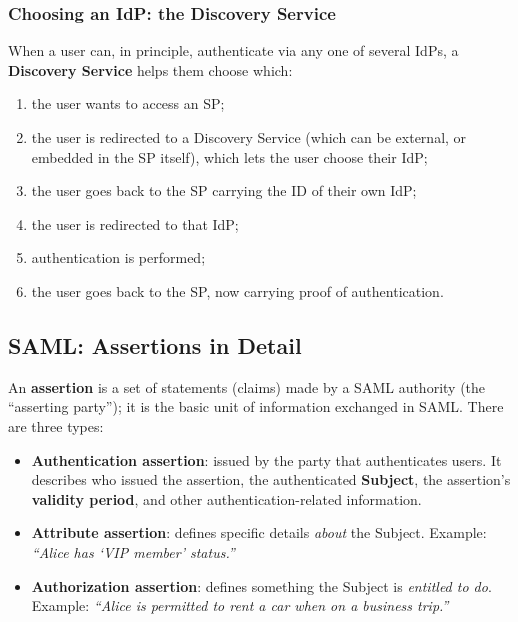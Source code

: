 \documentclass[12pt, a4paper]{article}
\begin{document}
\subsubsection{Choosing an IdP: the Discovery Service}
When a user can, in principle, authenticate via any one of several IdPs, a \textbf{Discovery Service} helps them choose which:
\begin{enumerate}
    \item the user wants to access an SP;
    \item the user is redirected to a Discovery Service (which can be external, or embedded in the SP itself), which lets the user choose their IdP;
    \item the user goes back to the SP carrying the ID of their own IdP;
    \item the user is redirected to that IdP;
    \item authentication is performed;
    \item the user goes back to the SP, now carrying proof of authentication.
\end{enumerate}











\subsection{SAML: Assertions in Detail}
\label{subsec:saml-assertions-06}

An \textbf{assertion} is a set of statements (claims) made by a SAML authority (the ``asserting party''); it is the basic unit of information exchanged in SAML. There are three types:
\begin{itemize}
    \item \textbf{Authentication assertion}: issued by the party that authenticates users. It describes who issued the assertion, the authenticated \textbf{Subject}, the assertion's \textbf{validity period}, and other authentication-related information.
    \item \textbf{Attribute assertion}: defines specific details \emph{about} the Subject. Example: \textit{``Alice has `VIP member' status.''}
    \item \textbf{Authorization assertion}: defines something the Subject is \emph{entitled to do}. Example: \textit{``Alice is permitted to rent a car when on a business trip.''}
\end{itemize}
\end{document}
